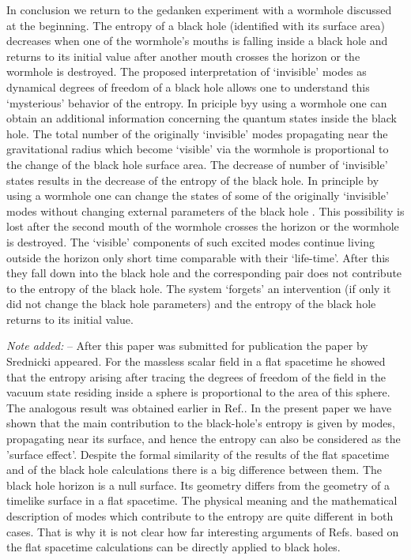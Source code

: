 \documentclass[superscriptaddress,showpacs,preprintnumbers,amsmath,amssymb,
nofootinbib,aps,prd,12pt]{revtex4-1}
\begin{document}
In conclusion  we return  to the  gedanken experiment  with a wormhole
\cite{FrNo:93} discussed at the beginning.  The entropy of a black hole
(identified with  its surface area)  decreases when  one of  the wormhole's
mouths is falling inside a black hole and returns to its initial value
after another mouth crosses the horizon or the wormhole is destroyed.
The proposed interpretation of `invisible' modes  as dynamical  degrees
of freedom of  a black hole allows one to  understand this `mysterious'
behavior of the entropy. In priciple byy using a wormhole one can obtain an
additional information concerning the quantum  states  inside  the  black
hole.  The  total number  of the originally `invisible' modes
propagating near the gravitational radius which become `visible' via
the wormhole is proportional to the  change of the black hole surface
area. The decrease of number of  `invisible' states results in the
decrease of the entropy of the black hole.  In principle  by using  a
wormhole  one can  change the states of some of the originally
`invisible' modes without changing external parameters of the black hole
\cite{note4}. This
possibility is lost after the second mouth of the wormhole crosses the
horizon or the wormhole is destroyed. The `visible' components  of such
excited modes continue living outside the horizon only short time
comparable with their `life-time'. After this they fall down into  the
black  hole  and  the corresponding  pair  does  not contribute to the
entropy of the black hole. The system `forgets' an intervention  (if
only  it did  not  change  the black hole parameters) and  the entropy
of the  black hole  returns to  its initial value.

\vspace{.5cm}
{\em Note added:} -- After this paper was submitted for publication the
paper by Srednicki \cite{Sred:93} appeared. For the massless scalar
field in a flat spacetime he showed that the entropy
arising after tracing the degrees of freedom of the field in the vacuum
state residing inside a sphere is proportional to the area of this sphere.
The analogous result was obtained earlier in Ref.\cite{BoKoLeSo:86}.
In the present paper we have shown that the main contribution to the
black-hole's entropy is given by modes, propagating near its surface,
and hence the entropy can also be considered as the 'surface effect'.
Despite the formal similarity of the results of the flat spacetime
and of the black hole calculations there is a big difference between them.
The black hole horizon is a null surface.
Its geometry differs from the geometry of a timelike surface in a flat
spacetime.
The physical meaning and the mathematical description of modes which
contribute
to the entropy are quite different in both cases.
That is why it is not clear how far interesting arguments of
Refs.\cite{Sred:93,BoKoLeSo:86}
based on the flat spacetime calculations can be
directly applied to black holes.
\end{document}

